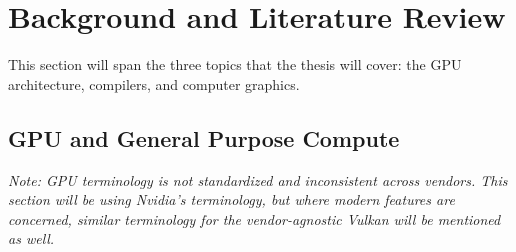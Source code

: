 \documentclass[review, acmsmall, nonacm]{acmart}
\begin{document}
\begin{abstract}
The overarching theme of this thesis is to master utilization of the GPU through compilers. To demonstrate this, we will answer the following research questions:
\begin{itemize}
  \item RQ1: What are the restrictions that automatic optimization of linear algebra programs faces?
  \item RQ2: What is a suitable abstraction for designating parts of a program to use the raytracing pipeline, such that we can apply compiler techniques to achieve a performant program that fully utilizes all capabilities of the GPU?
  \item RQ3: Can program rewrites reduce the performance gap between raytraced and rasterized workflows in real-time scenarios? 
\end{itemize}
\end{abstract}

\maketitle

\section{Background and Literature Review}

This section will span the three topics that the thesis will cover: the GPU architecture, compilers, and computer graphics.

\subsection{GPU and General Purpose Compute}

\emph{Note: GPU terminology is not standardized and inconsistent across vendors. This section will be using Nvidia's terminology, but where modern features are concerned, similar terminology for the vendor-agnostic Vulkan \cite{vulkanHomeVulkanCross2025} will be mentioned as well.}
\end{document}
